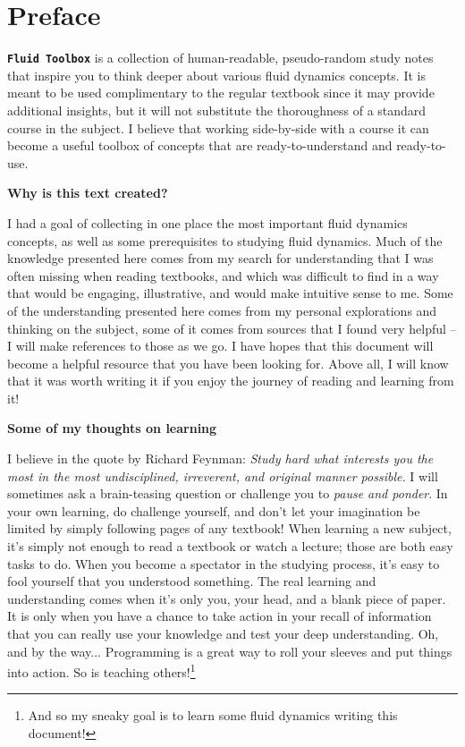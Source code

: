 \documentclass[12pt]{report}
\begin{document}
\setlength{\parskip}{0.6em}
\setlength{\parindent}{0cm}

\chapter*{Preface}
\thispagestyle{empty}



\texttt{\textbf{Fluid Toolbox}} is a collection of human-readable, pseudo-random study notes that inspire you to think deeper about various fluid dynamics concepts. It is meant to be used complimentary to the regular textbook since it may provide additional insights, but it will not substitute the thoroughness of a standard course in the subject. I believe that working side-by-side with a course it can become a useful toolbox of concepts that are ready-to-understand and ready-to-use.

\textbf{Why is this text created?}

I had a goal of collecting in one place the most important fluid dynamics concepts, as well as some prerequisites to studying fluid dynamics. Much of the knowledge presented here comes from my search for understanding that I was often missing when reading textbooks, and which was difficult to find in a way that would be engaging, illustrative, and would make intuitive sense to me. Some of the understanding presented here comes from my personal explorations and thinking on the subject, some of it comes from sources that I found very helpful -- I will make references to those as we go. I have hopes that this document will become a helpful resource that you have been looking for. Above all, I will know that it was worth writing it if you enjoy the journey of reading and learning from it!

\textbf{Some of my thoughts on learning}

I believe in the quote by Richard Feynman: \textit{Study hard what interests you the most in the most undisciplined, irreverent, and original manner possible.} I will sometimes ask a brain-teasing question or challenge you to \textit{pause and ponder}. In your own learning, do challenge yourself, and don't let your imagination be limited by simply following pages of any textbook! When learning a new subject, it's simply not enough to read a textbook or watch a lecture; those are both easy tasks to do. When you become a spectator in the studying process, it's easy to fool yourself that you understood something. The real learning and understanding comes when it's only you, your head, and a blank piece of paper. It is only when you have a chance to take action in your recall of information that you can really use your knowledge and test your deep understanding. Oh, and by the way... Programming is a great way to roll your sleeves and put things into action. So is teaching others!\footnote{And so my sneaky goal is to learn some fluid dynamics writing this document!}
\end{document}
